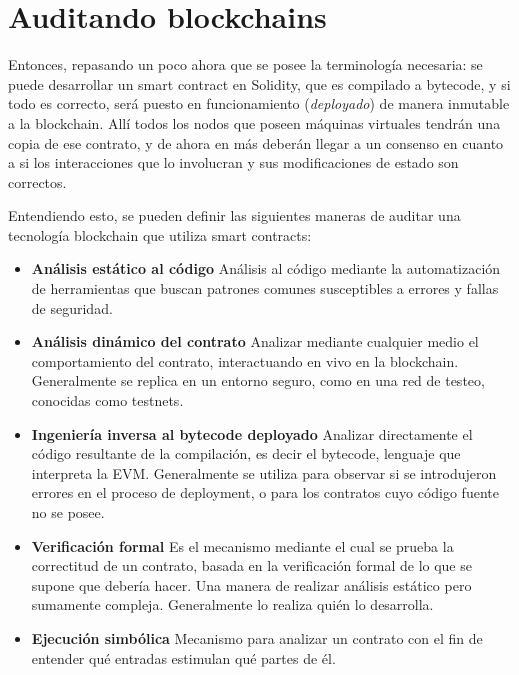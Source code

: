 \section{Auditando blockchains}
Entonces, repasando un poco ahora que se posee la terminología necesaria: se puede desarrollar un smart contract en Solidity, que es compilado a bytecode, y si todo es correcto, será puesto en funcionamiento (\textit{deployado}) de manera inmutable a la blockchain. Allí todos los nodos que poseen máquinas virtuales tendrán una copia de ese contrato, y de ahora en más deberán llegar a un consenso en cuanto a si los interacciones que lo involucran y sus modificaciones de estado son correctos.

Entendiendo esto, se pueden definir las siguientes maneras de auditar una tecnología blockchain que utiliza smart contracts:
\begin{itemize}
    \item \textbf{Análisis estático al código}\newline
    Análisis al código mediante la automatización de herramientas que buscan patrones comunes susceptibles a errores y fallas de seguridad.
    \item \textbf{Análisis dinámico del contrato}\newline
    Analizar mediante cualquier medio el comportamiento del contrato, interactuando en vivo en la blockchain. Generalmente se replica en un entorno seguro, como en una red de testeo, conocidas como testnets.
    \item \textbf{Ingeniería inversa al bytecode deployado}\newline
    Analizar directamente el código resultante de la compilación, es decir el bytecode, lenguaje que interpreta la EVM. Generalmente se utiliza para observar si se introdujeron errores en el proceso de deployment, o para los contratos cuyo código fuente no se posee.
    \item \textbf{Verificación formal}\newline
    Es el mecanismo mediante el cual se prueba la correctitud de un contrato, basada en la verificación formal de lo que se supone que debería hacer. Una manera de realizar análisis estático pero sumamente compleja. Generalmente lo realiza quién lo desarrolla.
    \item \textbf{Ejecución simbólica}\newline
    Mecanismo para analizar un contrato con el fin de entender qué entradas estimulan qué partes de él.
\end{itemize}

